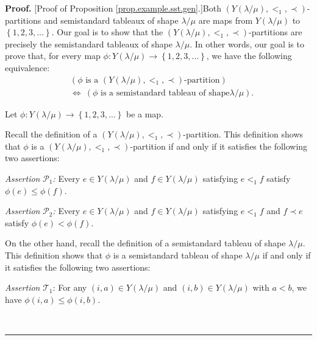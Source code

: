 \documentclass[numbers=enddot,12pt,final,onecolumn,notitlepage,abstracton]{scrartcl}
\theoremstyle{definition}
\newenvironment{proof}[1][Proof]{\noindent\textbf{#1.} }{\ \rule{0.5em}{0.5em}}
\newenvironment{verlong}{}{}
\begin{document}
\begin{verlong}
\begin{footnotesize}
\begin{proof}
[Proof of Proposition \ref{prop.example.sst.gen}.]Both $\left(  Y\left(
\lambda/\mu\right)  ,<_{1},\prec\right)  $-partitions and semistandard
tableaux of shape $\lambda/\mu$ are maps from $Y\left(  \lambda/\mu\right)  $
to $\left\{  1,2,3,\ldots\right\}  $. Our goal is to show that the $\left(
Y\left(  \lambda/\mu\right)  ,<_{1},\prec\right)  $-partitions are precisely
the semistandard tableaux of shape $\lambda/\mu$. In other words, our goal is
to prove that, for every map $\phi:Y\left(  \lambda/\mu\right)  \rightarrow
\left\{  1,2,3,\ldots\right\}  $, we have the following equivalence:%
\begin{align}
&  \left(  \phi\text{ is a }\left(  Y\left(  \lambda/\mu\right)  ,<_{1}%
,\prec\right)  \text{-partition}\right) \nonumber\\
&  \Longleftrightarrow\ \left(  \phi\text{ is a semistandard tableau of shape
}\lambda/\mu\right)  . \label{pf.prop.example.sst.gen.goal}%
\end{align}


Let $\phi:Y\left(  \lambda/\mu\right)  \rightarrow\left\{  1,2,3,\ldots
\right\}  $ be a map.

Recall the definition of a $\left(  Y\left(  \lambda/\mu\right)  ,<_{1}%
,\prec\right)  $-partition. This definition shows that $\phi$ is a $\left(
Y\left(  \lambda/\mu\right)  ,<_{1},\prec\right)  $-partition if and only if
it satisfies the following two assertions:

\textit{Assertion }$\mathcal{P}_{1}$\textit{:} Every $e\in Y\left(
\lambda/\mu\right)  $ and $f\in Y\left(  \lambda/\mu\right)  $ satisfying
$e<_{1}f$ satisfy $\phi\left(  e\right)  \leq\phi\left(  f\right)  $.

\textit{Assertion }$\mathcal{P}_{2}$\textit{:} Every $e\in Y\left(
\lambda/\mu\right)  $ and $f\in Y\left(  \lambda/\mu\right)  $ satisfying
$e<_{1}f$ and $f\prec e$ satisfy $\phi\left(  e\right)  <\phi\left(  f\right)
$.

On the other hand, recall the definition of a semistandard tableau of shape
$\lambda/\mu$. This definition shows that $\phi$ is a semistandard tableau of
shape $\lambda/\mu$ if and only if it satisfies the following two assertions:

\textit{Assertion }$\mathcal{T}_{1}$: For any $\left(  i,a\right)  \in
Y\left(  \lambda/\mu\right)  $ and $\left(  i,b\right)  \in Y\left(
\lambda/\mu\right)  $ with $a<b$, we have $\phi\left(  i,a\right)  \leq
\phi\left(  i,b\right)  $.


\end{proof}
\end{footnotesize}
\end{verlong}
\end{document}

